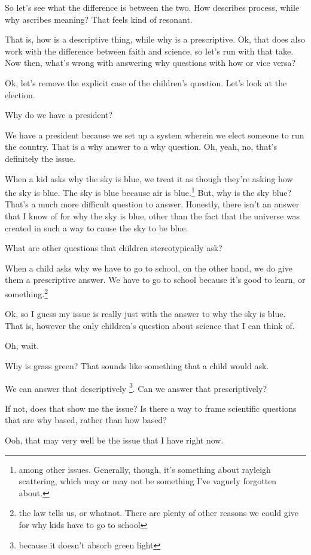 \documentclass[12pt]{article}[titlepage]
\renewcommand{\,}{\textsuperscript{,}}
\begin{document}
So let's see what the difference is between the two.
How describes process, while why ascribes meaning?
That feels kind of resonant.

That is, how is a descriptive thing, while why is a prescriptive.
Ok, that does also work with the difference between faith and science, so let's run with that take.
Now then, what's wrong with answering why questions with how or vice versa?

Ok, let's remove the explicit case of the children's question.
Let's look at the election.

Why do we have a president?

We have a president because we set up a system wherein we elect someone to run the country.
That is a why answer to a why question.
Oh, yeah, no, that's definitely the issue.

When a kid asks why the sky is blue, we treat it as though they're asking how the sky is blue.
The sky is blue because air is blue.\footnote{among other issues.
Generally, though, it's something about rayleigh scattering, which may or may not be something I've vaguely forgotten about.}
But, why is the sky blue? That's a much more difficult question to answer.
Honestly, there isn't an answer that I know of for why the sky is blue, other than the fact that the universe was created in such a way to cause the sky to be blue.

What are other questions that children stereotypically ask?

When a child asks why we have to go to school, on the other hand, we do give them a prescriptive answer.
We have to go to school because it's good to learn, or something.\footnote{the law tells us, or whatnot. There are plenty of other reasons we could give for why kids have to go to school}

Ok, so I guess my issue is really just with the answer to why the sky is blue.
That is, however the only children's question about science that I can think of.

Oh, wait.

Why is grass green?
That sounds like something that a child would ask.

We can answer that descriptively \footnote{because it doesn't absorb green light}.
Can we answer that prescriptively?

If not, does that show me the issue?
Is there a way to frame scientific questions that are why based, rather than how based?

Ooh, that may very well be the issue that I have right now.
\end{document}
